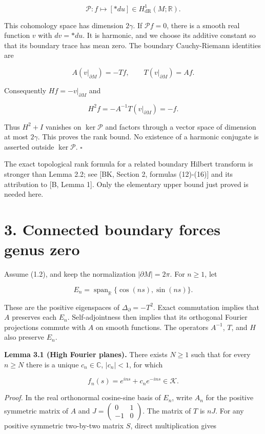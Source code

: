 \documentclass[11pt]{article}
\begin{document}
\[
\mathcal P:f\longmapsto[*du]\in H^1_{\mathrm{dR}}(M;\mathbb R).
\tag{2.6}
\]

This cohomology space has dimension \(2\gamma\). If \(\mathcal P f=0\),
there is a smooth real function \(v\) with \(dv=*du\). It is harmonic,
and we choose its additive constant so that its boundary trace has mean
zero. The boundary Cauchy-Riemann identities are

\[
A(v|_{\partial M})=-Tf,\qquad T(v|_{\partial M})=Af.
\tag{2.7}
\]

Consequently \(Hf=-v|_{\partial M}\) and

\[
H^2f=-A^{-1}T(v|_{\partial M})=-f.
\tag{2.8}
\]

Thus \(H^2+I\) vanishes on \(\ker\mathcal P\) and factors through a
vector space of dimension at most \(2\gamma\). This proves the rank
bound. No existence of a harmonic conjugate is asserted outside
\(\ker\mathcal P\). \(\square\)

The exact topological rank formula for a related boundary Hilbert
transform is stronger than Lemma 2.2; see {[}BK, Section 2, formulas
(12)-(16){]} and its attribution to {[}B, Lemma 1{]}. Only the
elementary upper bound just proved is needed here.

\section{3. Connected boundary forces genus
zero}\label{connected-boundary-forces-genus-zero}

Assume (1.2), and keep the normalization \(|\partial M|=2\pi\). For
\(n\geq1\), let

\[
E_n=\operatorname{span}_{\mathbb R}\{\cos(ns),\sin(ns)\}.
\tag{3.1}
\]

These are the positive eigenspaces of \(\Delta_\partial=-T^2\). Exact
commutation implies that \(A\) preserves each \(E_n\). Self-adjointness
then implies that its orthogonal Fourier projections commute with \(A\)
on smooth functions. The operators \(A^{-1}\), \(T\), and \(H\) also
preserve \(E_n\).

\textbf{Lemma 3.1 (High Fourier planes).} There exists \(N\geq1\) such
that for every \(n\geq N\) there is a unique \(c_n\in\mathbb C\),
\(|c_n|<1\), for which

\[
f_n(s)=e^{ins}+c_ne^{-ins}\in\mathcal K.
\tag{3.2}
\]

\emph{Proof.} In the real orthonormal cosine-sine basis of \(E_n\),
write \(A_n\) for the positive symmetric matrix of \(A\) and
\(J=\left(\begin{smallmatrix}0&1\\-1&0\end{smallmatrix}\right)\). The
matrix of \(T\) is \(nJ\). For any positive symmetric two-by-two matrix
\(S\), direct multiplication gives
\end{document}
